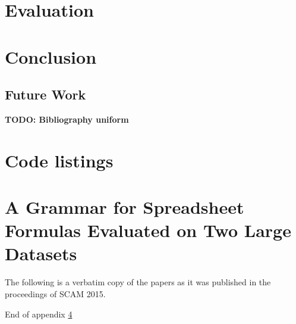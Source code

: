 \documentclass[12pt,a4paper,onecolumn,oneside,parskip]{memoir}
\newcommand{\todo}[1]{\textbf{TODO: #1}}
\begin{document}
%
%
%
%
%
%
%
%





\chapter{Evaluation}
\label{chapter:evaluation}

\chapter{Conclusion}

\section{Future Work}

\todo{Bibliography uniform}




\appendix

\chapter{Code listings}


\chapter{A Grammar for Spreadsheet Formulas Evaluated on Two Large Datasets}
\label{appendix:xlparser}

The following is a verbatim copy of the papers as it was published in the proceedings of SCAM 2015.

\clearpage



\clearpage

\vspace*{\fill}

\centering
\large{End of appendix \ref{appendix:xlparser}}

\vspace*{\fill}
\end{document}
